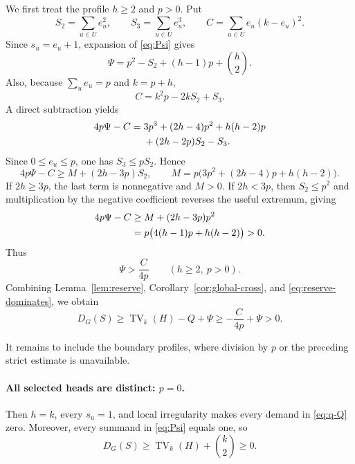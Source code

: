 \documentclass[a4paper,11pt]{amsart}
\numberwithin{equation}{section}
\theoremstyle{definition}
\theoremstyle{remark}
\newcommand{\TV}{\operatorname{TV}}
\begin{document}
We first treat the profile $h\ge2$ and $p>0$.  Put
\begin{equation}
S_2=\sum_{u\in U}e_u^2,
\qquad
S_3=\sum_{u\in U}e_u^3,
\qquad
C=\sum_{u\in U}e_u(k-e_u)^2.
\label{eq:S2-S3-C}
\end{equation}
Since $s_u=e_u+1$, expansion of \eqref{eq:Psi} gives
\begin{equation}
\Psi=p^2-S_2+(h-1)p+\binom h2.
\label{eq:Psi-expanded}
\end{equation}
Also, because $\sum_ue_u=p$ and $k=p+h$,
\begin{equation}
C=k^2p-2kS_2+S_3.
\label{eq:C-expanded}
\end{equation}
A direct subtraction yields
\begin{align}
4p\Psi-C
={}&3p^3+(2h-4)p^2+h(h-2)p\notag\\
&+(2h-2p)S_2-S_3.
\label{eq:gap-exact}
\end{align}
Since $0\le e_u\le p$, one has $S_3\le pS_2$.  Hence
\begin{equation}
4p\Psi-C
\ge M+(2h-3p)S_2,
\qquad
M=p\bigl(3p^2+(2h-4)p+h(h-2)\bigr).
\label{eq:gap-first-lower}
\end{equation}
If $2h\ge3p$, the last term is nonnegative and $M>0$.  If $2h<3p$, then $S_2\le p^2$ and multiplication by the negative coefficient reverses the useful extremum, giving
\begin{align}
4p\Psi-C
&\ge M+(2h-3p)p^2\notag\\
&=p\bigl(4(h-1)p+h(h-2)\bigr)>0.
\label{eq:gap-second-lower}
\end{align}
Thus
\begin{equation}
\Psi>\frac{C}{4p}
\qquad(h\ge2,\ p>0).
\label{eq:reserve-dominates}
\end{equation}
Combining Lemma~\ref{lem:reserve}, Corollary~\ref{cor:global-cross}, and \eqref{eq:reserve-dominates}, we obtain
\[
D_G(S)\ge\TV_k(H)-Q+\Psi
\ge-\frac{C}{4p}+\Psi>0.
\]

It remains to include the boundary profiles, where division by $p$ or the preceding strict estimate is unavailable.

\paragraph{All selected heads are distinct: $p=0$.}
Then $h=k$, every $s_u=1$, and local irregularity makes every demand in \eqref{eq:q-Q} zero.  Moreover, every summand in \eqref{eq:Psi} equals one, so
\begin{equation}
D_G(S)\ge\TV_k(H)+\binom{k}{2}\ge0.
\label{eq:p-zero-boundary}
\end{equation}
\end{document}

